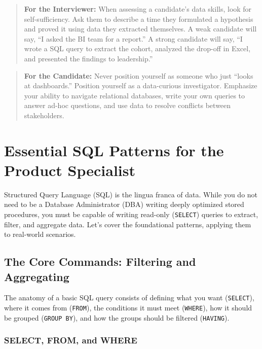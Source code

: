 \begin{quote}
\textbf{For the Interviewer:} When assessing a candidate's data skills,
look for self-sufficiency. Ask them to describe a time they formulated a
hypothesis and proved it using data they extracted themselves. A weak
candidate will say, ``I asked the BI team for a report.'' A strong
candidate will say, ``I wrote a SQL query to extract the cohort,
analyzed the drop-off in Excel, and presented the findings to
leadership.''
\end{quote}

\begin{quote}
\textbf{For the Candidate:} Never position yourself as someone who just
``looks at dashboards.'' Position yourself as a data-curious
investigator. Emphasize your ability to navigate relational databases,
write your own queries to answer ad-hoc questions, and use data to
resolve conflicts between stakeholders.
\end{quote}

\bigskip

\section{Essential SQL Patterns for the Product
Specialist}\label{essential-sql-patterns-for-the-product-specialist}

Structured Query Language (SQL) is the lingua franca of data. While you
do not need to be a Database Administrator (DBA) writing deeply
optimized stored procedures, you must be capable of writing read-only
(\texttt{SELECT}) queries to extract, filter, and aggregate data. Let's
cover the foundational patterns, applying them to real-world scenarios.

\subsection{The Core Commands: Filtering and
Aggregating}\label{the-core-commands-filtering-and-aggregating}

The anatomy of a basic SQL query consists of defining what you want
(\texttt{SELECT}), where it comes from (\texttt{FROM}), the conditions
it must meet (\texttt{WHERE}), how it should be grouped
(\texttt{GROUP\ BY}), and how the groups should be filtered
(\texttt{HAVING}).

\subsubsection{SELECT, FROM, and WHERE}\label{select-from-and-where}

